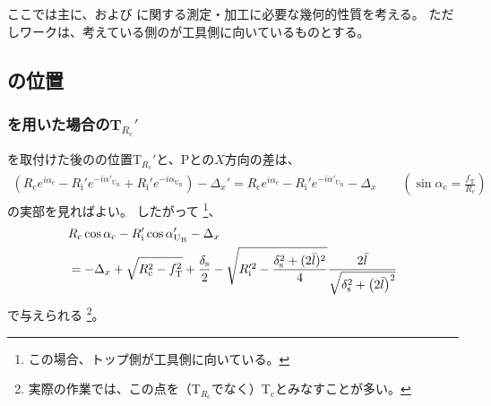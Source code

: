 

ここでは主に、\textbf{\EndFacecut}および\textbf{\OuterDiameter} に関する測定・加工に必要な幾何的性質を考える。
ただしワークは、考えている側の\EndFace が工具側に向いているものとする。





\subsection{\TopCurvatureCenter の位置}

\subsubsection{\Spacer を用いた場合のT\texorpdfstring{$_{R_\mathrm c}'$}{Rc'}}
\Spacer を取付けた後の\TopCurvatureCenter の位置T$_{R_\mathrm c}'$と、\TableCenter Pとの$X$方向の差は、
\begin{align*}
  \left(
    R_\mathrm ce^{i\alpha_\mathrm c}
    -R_\mathrm i'e^{-i\alpha'_{\mathrm U_\mathrm B}}
    +R_\mathrm i'e^{-i\alpha_{\mathrm U_\mathrm B}}
  \right)
  -\Delta_x'
  = R_\mathrm ce^{i\alpha_\mathrm c}-R_\mathrm i'e^{-i\alpha'_{\mathrm U_\mathrm B}}-\Delta_x \qquad
    \left(\sin\alpha_\mathrm c = \frac{f_\mathrm T}{R_\mathrm c}\right)
\end{align*}
の実部を見ればよい。
したがって
\footnote{この場合、トップ側が工具側に向いている。}、
\begin{align}
  \notag
  &  R_\mathrm c\cos\alpha_\mathrm c-R_\mathrm i'\cos\alpha'_{\mathrm U_\mathrm B}-\Delta_x\\
  &= -\Delta_x+\sqrt{R_\mathrm c^2-f_\mathrm T^2}+\frac{\delta_\mathrm s}2
     -\sqrt{R_\mathrm i'^2-\frac{\delta_\mathrm s^2+(2\bar l)^2}4}
      \frac{2\bar l}{\sqrt{\delta_\mathrm s^2+\left(2\bar l\right)^2}}
     \label{eq:spacerTRc}
\end{align}
で与えられる
\footnote{実際の作業では、この点を（\TopCurvatureCenter T$_{R_\mathrm c}\!$でなく）\OutcutCenter T$_\mathrm c$とみなすことが多い。}。


